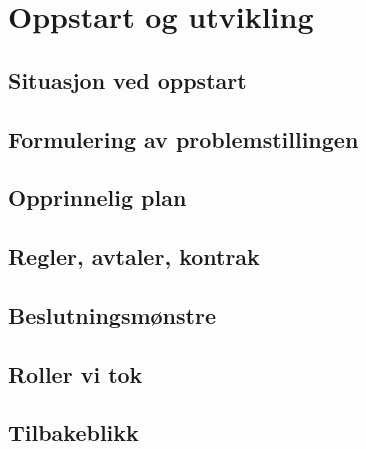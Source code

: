 
\chapter{Oppstart og utvikling}

\section{Situasjon ved oppstart}

\section{Formulering av problemstillingen}

\section{Opprinnelig plan}

\section{Regler, avtaler, kontrak}

\section{Beslutningsmønstre}

\section{Roller vi tok}

\section{Tilbakeblikk}
